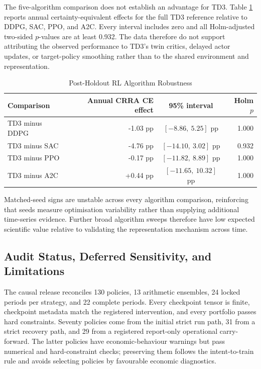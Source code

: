 The five-algorithm comparison does not establish an advantage for TD3. Table \ref{tab:algorithm_effects} reports annual certainty-equivalent effects for the full TD3 reference relative to DDPG, SAC, PPO, and A2C. Every interval includes zero and all Holm-adjusted two-sided $p$-values are at least 0.932. The data therefore do not support attributing the observed performance to TD3's twin critics, delayed actor updates, or target-policy smoothing rather than to the shared environment and representation.

\begin{table}[H]
\centering
\caption{Post-Holdout RL Algorithm Robustness}
\label{tab:algorithm_effects}
\begin{tabular}{l r c r}
\toprule
\textbf{Comparison} & \textbf{Annual CRRA CE effect} & \textbf{95\% interval} & \textbf{Holm $p$} \\
\midrule
TD3 minus DDPG & -1.03 pp & $[-8.86,\ 5.25]$ pp & 1.000 \\
TD3 minus SAC & -4.76 pp & $[-14.10,\ 3.02]$ pp & 0.932 \\
TD3 minus PPO & -0.17 pp & $[-11.82,\ 8.89]$ pp & 1.000 \\
TD3 minus A2C & +0.44 pp & $[-11.65,\ 10.32]$ pp & 1.000 \\
\bottomrule
\end{tabular}
\end{table}

Matched-seed signs are unstable across every algorithm comparison, reinforcing that seeds measure optimisation variability rather than supplying additional time-series evidence. Further broad algorithm sweeps therefore have low expected scientific value relative to validating the representation mechanism across time.

\subsection{Audit Status, Deferred Sensitivity, and Limitations}
\label{subsec:4_audit_limitations}

The causal release reconciles 130 policies, 13 arithmetic ensembles, 24 locked periods per strategy, and 22 complete periods. Every checkpoint tensor is finite, checkpoint metadata match the registered intervention, and every portfolio passes hard constraints. Seventy policies come from the initial strict run path, 31 from a strict recovery path, and 29 from a registered report-only operational carry-forward. The latter policies have economic-behaviour warnings but pass numerical and hard-constraint checks; preserving them follows the intent-to-train rule and avoids selecting policies by favourable economic diagnostics.

